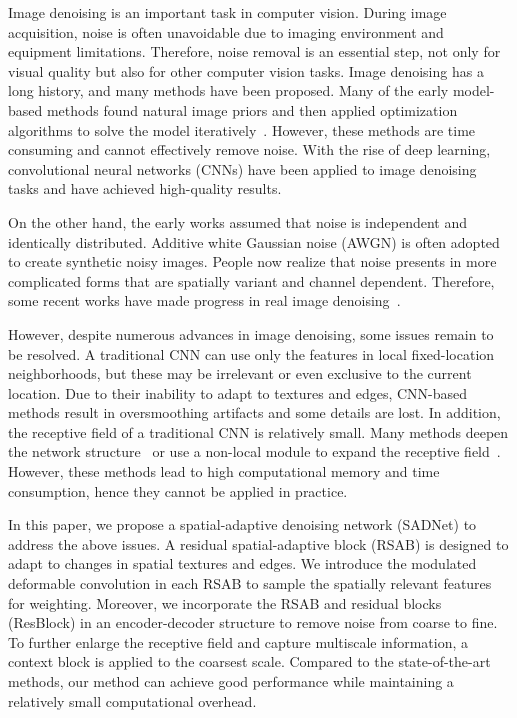 \documentclass[runningheads]{llncs}
\begin{document}
Image denoising is an important task in computer vision. During image acquisition, noise is often unavoidable due to imaging environment and equipment limitations. Therefore, noise removal is an essential step, not only for visual quality but also for other computer vision tasks. Image denoising has a long history, and many methods have been proposed. Many of the early model-based methods found natural image priors and then applied optimization algorithms to solve the model iteratively~\cite{osher2005iterative,aharon2006k,xu2007iterative,zoran2011learning}. However, these methods are time consuming and cannot effectively remove noise. With the rise of deep learning, convolutional neural networks (CNNs) have been applied to image denoising tasks and have achieved high-quality results. 



On the other hand, the early works assumed that noise is independent and identically distributed. Additive white Gaussian noise (AWGN) is often adopted to create synthetic noisy images. People now realize that noise presents in more complicated forms that are spatially variant and channel dependent. Therefore, some recent works have made progress in real image denoising~\cite{Ploetz2018NNN,zhou2019awgn,guo2019toward,anwar2019real}. 

However, despite numerous advances in image denoising, some issues remain to be resolved. A traditional CNN can use only the features in local fixed-location neighborhoods, but these may be irrelevant or even exclusive to the current location. Due to their inability to adapt to textures and edges, CNN-based methods result in oversmoothing artifacts and some details are lost. In addition, the receptive field of a traditional CNN is relatively small. Many methods deepen the network structure~\cite{tai2017memnet} or use a non-local module to expand the receptive field~\cite{liu2018non,zhang2019residual}. However, these methods lead to high computational memory and time consumption, hence they cannot be applied in practice. 

In this paper, we propose a spatial-adaptive denoising network (SADNet) to address the above issues. A residual spatial-adaptive block (RSAB) is designed to adapt to changes in spatial textures and edges. We introduce the modulated deformable convolution in each RSAB to sample the spatially relevant features for weighting. Moreover, we incorporate the RSAB and residual blocks (ResBlock) in an encoder-decoder structure to remove noise from coarse to fine. To further enlarge the receptive field and capture multiscale information, a context block is applied to the coarsest scale. Compared to the state-of-the-art methods, our method can achieve good performance while maintaining a relatively small computational overhead. 
\end{document}
